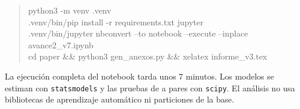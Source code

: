 \documentclass[10.5pt,a4paper,headings=small,abstract=false,bibliography=totoc,listof=totoc]{scrartcl}
\begin{document}
\begin{quote}\small\ttfamily
python3 -m venv .venv\\
.venv/bin/pip install -r requirements.txt jupyter\\
.venv/bin/jupyter nbconvert --to notebook --execute --inplace avance2\_v7.ipynb\\
cd paper \&\& python3 gen\_anexos.py \&\& xelatex informe\_v3.tex
\end{quote}

La ejecución completa del notebook tarda unos 7 minutos. Los modelos se estiman con \texttt{statsmodels} y las pruebas de a pares con \texttt{scipy}. El análisis no usa bibliotecas de aprendizaje automático ni particiones de la base.
\end{document}
